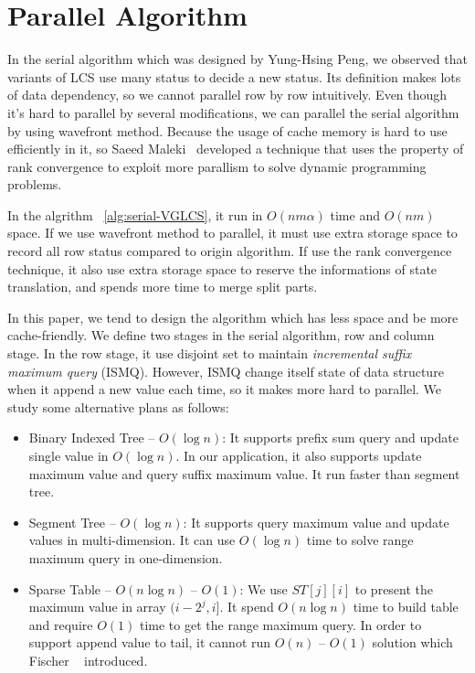 \section{Parallel Algorithm} %
\label{sec:parallelSerial}

In the serial algorithm which was designed by Yung-Hsing Peng, we observed that variants of LCS use many status to decide a new status. Its definition makes lots of data dependency, so we cannot parallel row by row intuitively. Even though it's hard to parallel by several modifications, we can parallel the serial algorithm by using wavefront method. Because the usage of cache  memory is hard to use efficiently in it, so Saeed Maleki~\cite{saeed} developed a technique that uses the property of rank convergence to exploit more parallism to solve dynamic programming problems.



In the algrithm ~\ref{alg:serial-VGLCS}, it run in $O(nm \alpha)$ time and $O(nm)$ space. If we use wavefront method to parallel, it must use extra storage space to record all row status compared to origin algorithm. If use the rank convergence technique, it also use extra storage space to reserve the informations of state translation, and spends more time to merge split parts.

In this paper, we tend to design the algorithm which has less space and be more cache-friendly. We define two stages in the serial algorithm, row and column stage. In the row stage, it use disjoint set to maintain \emph{incremental suffix maximum query} (ISMQ).  However, ISMQ change itself state of data structure when it append a new value each time, so it makes more hard to parallel.  We study some alternative plans as follows:

\begin{itemize}
  \item Binary Indexed Tree -- $O(\log n)$: It supports prefix sum query and update single value in $O(\log n)$.  In our application, it also supports update maximum value and query suffix maximum value.  It run faster than segment tree.
  \item Segment Tree -- $O(\log n)$: It supports query maximum value and update values in multi-dimension.  It can use $O(\log n)$ time to solve range maximum query in one-dimension.
  \item Sparse Table -- $O(n \log n)$ -- $O(1)$:
    We use $ST[j][i]$ to present the maximum value in array $(i-2^j,i]$. It spend $O(n \log n)$ time to build table and require $O(1)$ time to get the range maximum query. In order to support append value to tail, it cannot run $O(n)$ -- $O(1)$ solution which Fischer ~\cite{fischer} introduced.
\end{itemize}

